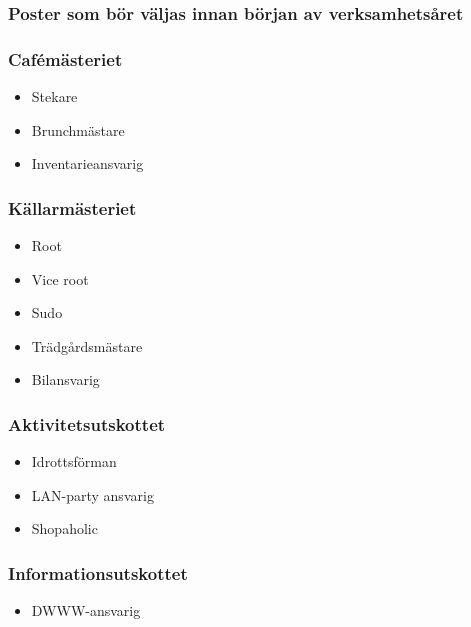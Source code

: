 \documentclass{dsekprotokoll}
\begin{document}
\subsubsection*{Poster som bör väljas innan början av verksamhetsåret}
\begin{multicols}{2}

    \subsubsection*{Cafémästeriet}
    \begin{itemize}
        \item Stekare
        \item Brunchmästare
        \item Inventarieansvarig
    \end{itemize}

    \subsubsection*{Källarmästeriet}
    \begin{itemize}
        \item Root
        \item Vice root
        \item Sudo
        \item Trädgårdsmästare
        \item Bilansvarig
    \end{itemize}

    \subsubsection*{Aktivitetsutskottet}
    \begin{itemize}
        \item Idrottsförman
        \item LAN-party ansvarig
        \item Shopaholic
    \end{itemize}

    \subsubsection*{Informationsutskottet}
    \begin{itemize}
        \item DWWW-ansvarig
    \end{itemize}


\end{multicols}
\end{document}
